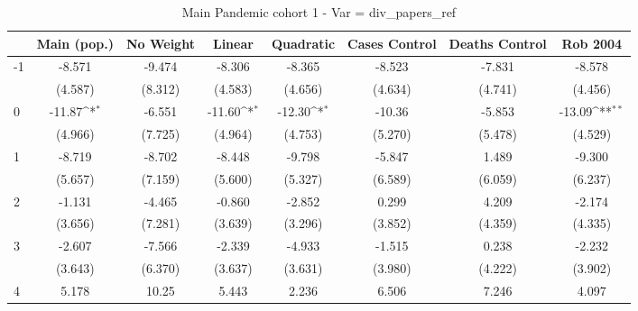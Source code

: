 \documentclass{article}
\begin{document}
{
\def\sym#1{\ifmmode^{#1}\else\(^{#1}\)\fi}
\begin{longtable}{l*{7}{c}}
\caption{Main Pandemic cohort 1 - Var = div\_papers\_ref}\\
\hline\hline\endfirsthead\hline\endhead\hline\endfoot\endlastfoot
                &\multicolumn{1}{c}{Main (pop.)}&\multicolumn{1}{c}{No Weight}&\multicolumn{1}{c}{Linear}&\multicolumn{1}{c}{Quadratic}&\multicolumn{1}{c}{Cases Control}&\multicolumn{1}{c}{Deaths Control}&\multicolumn{1}{c}{Rob 2004}\\
\hline
-1              &   -8.571         &   -9.474         &   -8.306         &   -8.365         &   -8.523         &   -7.831         &   -8.578         \\
                &  (4.587)         &  (8.312)         &  (4.583)         &  (4.656)         &  (4.634)         &  (4.741)         &  (4.456)         \\
0               &   -11.87\sym{*}  &   -6.551         &   -11.60\sym{*}  &   -12.30\sym{*}  &   -10.36         &   -5.853         &   -13.09\sym{**} \\
                &  (4.966)         &  (7.725)         &  (4.964)         &  (4.753)         &  (5.270)         &  (5.478)         &  (4.529)         \\
1               &   -8.719         &   -8.702         &   -8.448         &   -9.798         &   -5.847         &    1.489         &   -9.300         \\
                &  (5.657)         &  (7.159)         &  (5.600)         &  (5.327)         &  (6.589)         &  (6.059)         &  (6.237)         \\
2               &   -1.131         &   -4.465         &   -0.860         &   -2.852         &    0.299         &    4.209         &   -2.174         \\
                &  (3.656)         &  (7.281)         &  (3.639)         &  (3.296)         &  (3.852)         &  (4.359)         &  (4.335)         \\
3               &   -2.607         &   -7.566         &   -2.339         &   -4.933         &   -1.515         &    0.238         &   -2.232         \\
                &  (3.643)         &  (6.370)         &  (3.637)         &  (3.631)         &  (3.980)         &  (4.222)         &  (3.902)         \\
4               &    5.178         &    10.25         &    5.443         &    2.236         &    6.506         &    7.246         &    4.097         \\

\end{longtable}}
\end{document}
